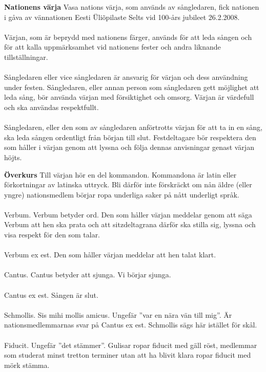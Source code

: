 \begin{intersong}
\begin{scriptsize}
\flushleft\textbf{Nationens värja}
Vasa nations värja, som används av sångledaren, fick nationen i gåva av vännationen Eesti Üli\~{o}pilaste Selts vid 100-års jubileet 26.2.2008. 
\\
~\\
Värjan, som är beprydd med nationens färger, används för att leda sången och för att kalla uppmärksamhet vid nationens fester och andra liknande tillställningar.
\\
~\\
Sångledaren eller vice sångledaren är ansvarig för värjan och dess användning under festen. Sångledaren, eller annan person som sångledaren gett möjlighet att leda sång, bör använda värjan med försiktighet och omsorg. Värjan är värdefull och ska användas respektfullt. 
\\
~\\
Sångledaren, eller den som av sångledaren anförtrotts värjan för att ta in en sång, ska leda sången ordentligt från början till slut. Festdeltagare bör respektera den som håller i värjan genom att lyssna och följa dennas anvisningar genast värjan höjts.

\flushleft\textbf{Överkurs}
Till värjan hör en del kommandon. Kommandona är latin eller förkortningar av latinska uttryck. Bli därför inte förskräckt om nån äldre (eller yngre) nationsmedlem börjar ropa underliga saker på nått underligt språk. 
\\
~\\
Verbum. Verbum betyder ord. Den som håller värjan meddelar genom att säga Verbum att hen ska prata och att sitzdeltagrana därför ska stilla sig, lyssna och visa respekt för den som talar.
\\
~\\
Verbum ex est. Den som håller värjan meddelar att hen talat klart.
\\
~\\
Cantus.  Cantus betyder att sjunga. Vi börjar sjunga.
\\
~\\
Cantus ex est. Sången är slut.
\\
~\\
Schmollis. Sis mihi mollis amicus. Ungefär ”var en nära vän till mig”. Är nationsmedlemmarnas svar på Cantus ex est. Schmollis sägs här istället för skål.  
\\
~\\
Fiducit. Ungefär ”det stämmer”. Gulisar ropar fiducit med gäll röst, medlemmar som studerat minst tretton terminer utan att ha blivit klara ropar fiducit med mörk stämma.

\end{scriptsize}
\end{intersong}